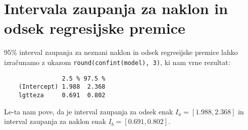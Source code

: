 \section{Intervala zaupanja za naklon in odsek regresijske premice}

95\% interval zaupanja za neznani naklon in odsek regresijske premice lahko
izračunamo z ukazom \verb|round(confint(model), 3)|, ki nam vrne rezultat:

\begin{verbatim}
                2.5 % 97.5 %
    (Intercept) 1.988  2.368
    lgtteza     0.691  0.802
\end{verbatim}

Le-ta nam pove, da je interval zaupanja za odsek enak $I_{a} = [1.988, 2.368]$
in interval zaupanja za naklon enak $I_{b} = [0.691, 0.802]$.